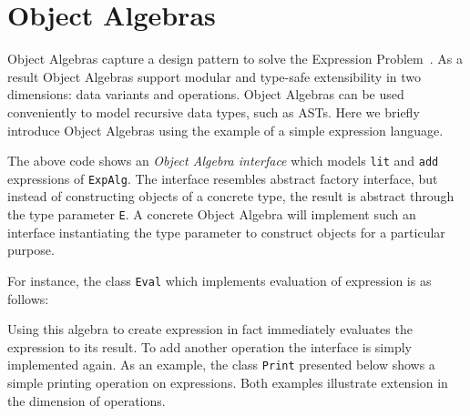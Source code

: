 \section{Object Algebras}\label{subsec:ObjectAlgebras}

Object Algebras capture a design pattern to solve the Expression Problem~\cite{wadler98expression-problem}.
As a result Object Algebras support modular and type-safe extensibility in two dimensions:
data variants and operations. Object Algebras can be used conveniently to model recursive data types, such as ASTs. Here we briefly introduce Object Algebras using the example of a simple expression language.


The above code shows an \emph{Object Algebra interface} which models \lstinline{lit} and \lstinline{add} expressions of \lstinline{ExpAlg}. The interface resembles abstract factory interface, but instead of constructing objects of a concrete type, the result is abstract through the type parameter \lstinline{E}.
A concrete Object Algebra will implement such an interface instantiating the type parameter to construct objects for a particular purpose.

For instance, the class \lstinline{Eval} which implements evaluation of expression is as follows:


Using this algebra to create expression in fact immediately evaluates the expression to its result.
To add another operation the interface is simply implemented again. As an example, the class \lstinline{Print} presented below shows a simple printing operation on expressions. Both examples illustrate extension in the dimension of operations.



